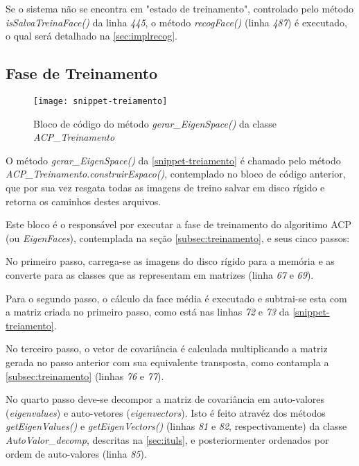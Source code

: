 Se o sistema não se encontra em "estado de treinamento", controlado pelo método \textit{isSalvaTreinaFace()} da linha \textit{445}, o método \textit{recogFace()} (linha \textit{487}) é executado, o qual será detalhado na \autoref{sec:implrecog}.


\subsection{Fase de Treinamento}\label{sec:impltrein}

\begin{figure}[h]
	\centering
	\texttt{[image: snippet-treiamento]}
	\caption{Bloco de código do método \textit{gerar\_EigenSpace()} da classe \textit{ACP\_Treinamento}}
	\label{snippet-treiamento}
\end{figure}


O método \textit{gerar\_EigenSpace()} da \autoref{snippet-treiamento} é chamado pelo método \textit{ACP\_Treinamento.construirEspaco()}, contemplado no bloco de código anterior, que por sua vez resgata todas as imagens de treino salvar em disco rígido e retorna os caminhos destes arquivos.

Este bloco é o responsável por executar a fase de treinamento do algoritimo ACP (ou \textit{EigenFaces}), contemplada na seção \autoref{subsec:treinamento}, e seus cinco passos:

No primeiro passo, carrega-se as imagens do disco rígido para a memória e as converte para as classes que as representam em matrizes (linha \textit{67} e \textit{69}). 

Para o segundo passo, o cálculo da face média é executado e subtrai-se esta com a matriz criada no primeiro passo, como está nas linhas \textit{72} e \textit{73} da  \autoref{snippet-treiamento}.

No terceiro passo, o vetor de covariância é calculada multiplicando a matriz gerada no passo anterior com sua equivalente transposta, como contampla a \autoref{subsec:treinamento} (linhas \textit{76} e \textit{77}).

No quarto passo deve-se decompor a matriz de covariância em auto-valores (\textit{eigenvalues}) e auto-vetores (\textit{eigenvectors}). Isto é feito atravéz dos métodos \textit{getEigenValues()} e \textit{getEigenVectors()} (linhas \textit{81} e \textit{82}, respectivamente) da classe \textit{AutoValor\_decomp}, descritas na \autoref{sec:ituls}, e posteriormenter ordenados por ordem de auto-valores (linha \textit{85}).

